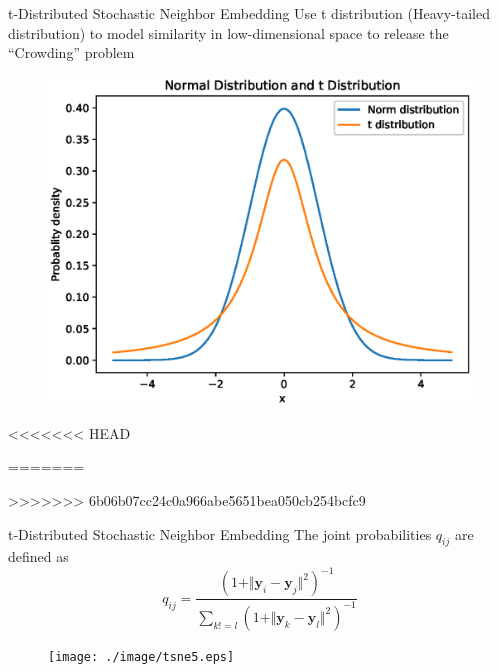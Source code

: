 \documentclass[10pt]{beamer}
\newcommand{\bol}[1]{\textbf{#1}}
\begin{document}
\begin{frame}{t-Distributed Stochastic Neighbor Embedding}
Use t distribution (Heavy-tailed distribution) to model similarity in low-dimensional space to release the ``Crowding'' problem
\begin{figure}
\centering
\includegraphics[scale=0.5]{./image/tsne2.eps}
\end{figure}
\end{frame}
<<<<<<< HEAD


=======


>>>>>>> 6b06b07cc24c0a966abe5651bea050cb254bcfc9
\begin{frame}{t-Distributed Stochastic Neighbor Embedding}
The joint probabilities $q_{ij}$ are defined as
\begin{displaymath}
	q_{ij} = \frac{(1 + \Vert \bol{y}_i - \bol{y}_j \Vert^2)^{-1}}{\sum_{k !=l}(1 + \Vert \bol{y}_k - \bol{y}_l \Vert^2)^{-1}}
\end{displaymath}
\begin{figure}
\centering
\texttt{[image: ./image/tsne5.eps]}
\end{figure}
\end{frame}
\end{document}
